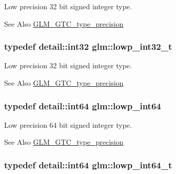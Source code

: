 Low precision 32 bit signed integer type. \begin{DoxySeeAlso}{See Also}
\hyperlink{group__gtc__type__precision}{G\-L\-M\-\_\-\-G\-T\-C\-\_\-type\-\_\-precision} 
\end{DoxySeeAlso}
\hypertarget{group__gtc__type__precision_gad9567c806dc39f534174eef42663119d}{
\subsubsection[{lowp\-\_\-int32\-\_\-t}]{\setlength{\rightskip}{0pt plus 5cm}typedef detail\-::int32 {\bf glm\-::lowp\-\_\-int32\-\_\-t}}}\label{group__gtc__type__precision_gad9567c806dc39f534174eef42663119d}
Low precision 32 bit signed integer type. \begin{DoxySeeAlso}{See Also}
\hyperlink{group__gtc__type__precision}{G\-L\-M\-\_\-\-G\-T\-C\-\_\-type\-\_\-precision} 
\end{DoxySeeAlso}
\hypertarget{group__gtc__type__precision_gab8a8e75af347592406e41b3ae2c0712b}{
\subsubsection[{lowp\-\_\-int64}]{\setlength{\rightskip}{0pt plus 5cm}typedef detail\-::int64 {\bf glm\-::lowp\-\_\-int64}}}\label{group__gtc__type__precision_gab8a8e75af347592406e41b3ae2c0712b}
Low precision 64 bit signed integer type. \begin{DoxySeeAlso}{See Also}
\hyperlink{group__gtc__type__precision}{G\-L\-M\-\_\-\-G\-T\-C\-\_\-type\-\_\-precision} 
\end{DoxySeeAlso}
\hypertarget{group__gtc__type__precision_ga14d72e76d57c7f28eca8e933816c9fd6}{
\subsubsection[{lowp\-\_\-int64\-\_\-t}]{\setlength{\rightskip}{0pt plus 5cm}typedef detail\-::int64 {\bf glm\-::lowp\-\_\-int64\-\_\-t}}}\label{group__gtc__type__precision_ga14d72e76d57c7f28eca8e933816c9fd6}
